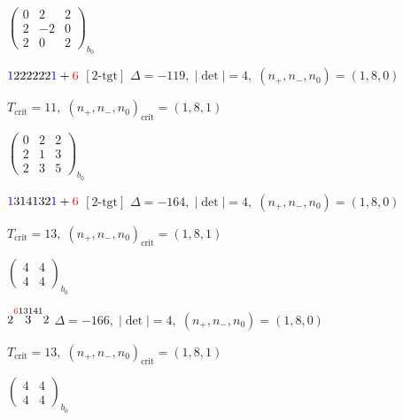 \documentclass[10pt]{article}
\begin{document}
\hspace{2em}$\left(\begin{smallmatrix}0 & 2 & 2 \\ 2 & -2 & 0 \\ 2 & 0 & 2\end{smallmatrix}\right)_{\!b_0}$

\smallskip

$\textcolor{blue}{1}222222\textcolor{blue}{1}+\textcolor{red}{6}$ $\scriptstyle [2\text{-tgt}]$ \quad $\Delta=-119,\; |\det|=4,\; (n_+,n_-,n_0)=(1,8,0)$

\hspace{1em}$T_{\text{crit}}=11,\; (n_+,n_-,n_0)_{\text{crit}}=(1,8,1)$

\hspace{2em}$\left(\begin{smallmatrix}0 & 2 & 2 \\ 2 & 1 & 3 \\ 2 & 3 & 5\end{smallmatrix}\right)_{\!b_0}$

\smallskip

$\textcolor{blue}{1}314132\textcolor{blue}{1}+\textcolor{red}{6}$ $\scriptstyle [2\text{-tgt}]$ \quad $\Delta=-164,\; |\det|=4,\; (n_+,n_-,n_0)=(1,8,0)$

\hspace{1em}$T_{\text{crit}}=13,\; (n_+,n_-,n_0)_{\text{crit}}=(1,8,1)$

\hspace{2em}$\left(\begin{smallmatrix}4 & 4 \\ 4 & 4\end{smallmatrix}\right)_{\!b_0}$

\smallskip

$2\overset{\textcolor{red}{6}13141}{3}2$ \quad $\Delta=-166,\; |\det|=4,\; (n_+,n_-,n_0)=(1,8,0)$

\hspace{1em}$T_{\text{crit}}=13,\; (n_+,n_-,n_0)_{\text{crit}}=(1,8,1)$

\hspace{2em}$\left(\begin{smallmatrix}4 & 4 \\ 4 & 4\end{smallmatrix}\right)_{\!b_0}$

\smallskip
\end{document}
